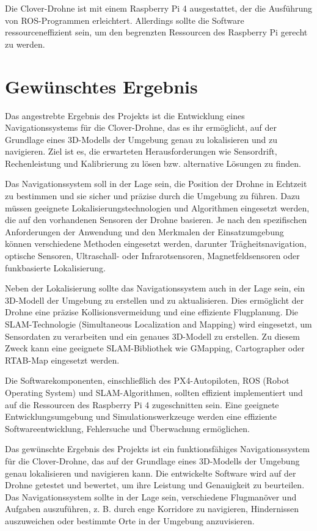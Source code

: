 Die Clover-Drohne ist mit einem Raspberry Pi 4 ausgestattet, der die Ausführung von ROS-Programmen erleichtert. Allerdings sollte die Software ressourceneffizient sein, um den begrenzten Ressourcen des Raspberry Pi gerecht zu werden.

\section{Gewünschtes Ergebnis} \label{gewuenschtes_ergebnis:section} 

Das angestrebte Ergebnis des Projekts ist die Entwicklung eines Navigationssystems für die Clover-Drohne, das es ihr ermöglicht, auf der Grundlage eines 3D-Modells der Umgebung genau zu lokalisieren und zu navigieren. Ziel ist es, die erwarteten Herausforderungen wie Sensordrift, Rechenleistung und Kalibrierung zu lösen bzw. alternative Lösungen zu finden.

Das Navigationssystem soll in der Lage sein, die Position der Drohne in Echtzeit zu bestimmen und sie sicher und präzise durch die Umgebung zu führen. Dazu müssen geeignete Lokalisierungstechnologien und Algorithmen eingesetzt werden, die auf den vorhandenen Sensoren der Drohne basieren. Je nach den spezifischen Anforderungen der Anwendung und den Merkmalen der Einsatzumgebung können verschiedene Methoden eingesetzt werden, darunter Trägheitsnavigation, optische Sensoren, Ultraschall- oder Infrarotsensoren, Magnetfeldsensoren oder funkbasierte Lokalisierung.

Neben der Lokalisierung sollte das Navigationssystem auch in der Lage sein, ein 3D-Modell der Umgebung zu erstellen und zu aktualisieren. Dies ermöglicht der Drohne eine präzise Kollisionsvermeidung und eine effiziente Flugplanung. Die SLAM-Technologie (Simultaneous Localization and Mapping) wird eingesetzt, um Sensordaten zu verarbeiten und ein genaues 3D-Modell zu erstellen. Zu diesem Zweck kann eine geeignete SLAM-Bibliothek wie GMapping, Cartographer oder RTAB-Map eingesetzt werden.

Die Softwarekomponenten, einschließlich des PX4-Autopiloten, ROS (Robot Operating System) und SLAM-Algorithmen, sollten effizient implementiert und auf die Ressourcen des Raspberry Pi 4 zugeschnitten sein. Eine geeignete Entwicklungsumgebung und Simulationswerkzeuge werden eine effiziente Softwareentwicklung, Fehlersuche und Überwachung ermöglichen.

Das gewünschte Ergebnis des Projekts ist ein funktionsfähiges Navigationssystem für die Clover-Drohne, das auf der Grundlage eines 3D-Modells der Umgebung genau lokalisieren und navigieren kann. Die entwickelte Software wird auf der Drohne getestet und bewertet, um ihre Leistung und Genauigkeit zu beurteilen. Das Navigationssystem sollte in der Lage sein, verschiedene Flugmanöver und Aufgaben auszuführen, z. B. durch enge Korridore zu navigieren, Hindernissen auszuweichen oder bestimmte Orte in der Umgebung anzuvisieren.

